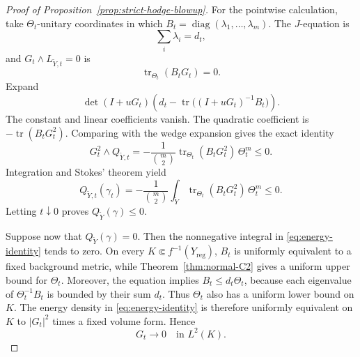 \documentclass[reqno]{amsart}
\newcommand{\tr}{\operatorname{tr}}
\newcommand{\reg}{\mathrm{reg}}
\theoremstyle{plain}
\theoremstyle{remark}
\begin{document}
\begin{proof}[Proof of Proposition~\ref{prop:strict-hodge-blowup}]
For the pointwise calculation, take $\Theta_t$-unitary coordinates
in which $B_t=\operatorname{diag}(\lambda_1,\ldots,\lambda_m)$.
The $J$-equation is
\[
 \sum_i\lambda_i=d_t,
\]
and $G_t\wedge L_{\widetilde Y,t}=0$ is
\[
 \tr_{\Theta_t}(B_tG_t)=0.
\]
Expand
\[
 \det(I+uG_t)
 \left(d_t-\tr\bigl((I+uG_t)^{-1}B_t\bigr)\right).
\]
The constant and linear coefficients vanish.  The quadratic coefficient
is $-\tr(B_tG_t^2)$.  Comparing with the wedge expansion gives the
exact identity
\begin{equation}\label{eq:pointwise-hodge}
 G_t^2\wedge Q_{\widetilde Y,t}
 =
 -\frac1{\binom{m}{2}}
 \tr_{\Theta_t}(B_tG_t^2)\,\Theta_t^m\leq0.
\end{equation}
Integration and Stokes' theorem yield
\begin{equation}\label{eq:energy-identity}
 Q_{\widetilde Y,t}(\gamma_t)
 =
 -\frac1{\binom{m}{2}}
 \int_{\widetilde Y}
 \tr_{\Theta_t}(B_tG_t^2)\,\Theta_t^m
 \leq0.
\end{equation}
Letting $t\downarrow0$ proves $Q_{\widetilde Y}(\gamma)\leq0$.

Suppose now that $Q_{\widetilde Y}(\gamma)=0$. Then the nonnegative
integral in \eqref{eq:energy-identity} tends to zero. On
every $K\Subset f^{-1}(Y_{\reg})$, $B_t$ is uniformly equivalent to
a fixed background metric, while Theorem~\ref{thm:normal-C2} gives a
uniform upper bound for $\Theta_t$. Moreover, the equation implies
$B_t\leq d_t\Theta_t$, because each eigenvalue of
$\Theta_t^{-1}B_t$ is bounded by their sum $d_t$. Thus $\Theta_t$ also
has a uniform lower bound on $K$. The energy density in
\eqref{eq:energy-identity} is therefore uniformly equivalent on $K$
to $|G_t|^2$ times a fixed volume form. Hence
\begin{equation}\label{eq:G-L2}
 G_t\longrightarrow0\quad\text{in }L^2(K).
\end{equation}


\end{proof}
\end{document}
